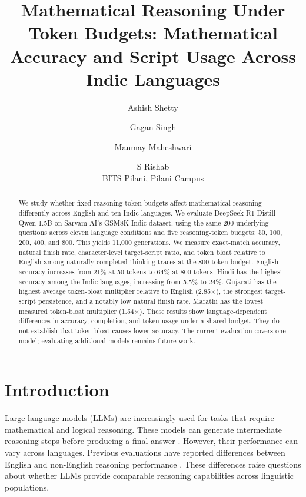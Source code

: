 \documentclass[11pt]{article}
\title{Mathematical Reasoning Under Token Budgets: Mathematical Accuracy and Script Usage Across Indic Languages}
\author{Ashish Shetty \and Gagan Singh \and Manmay Maheshwari  \and S Rishab \\
        BITS Pilani, Pilani Campus}
\begin{document}
\maketitle

\begin{abstract}
We study whether fixed reasoning-token budgets affect mathematical reasoning differently across English and ten Indic languages. We evaluate DeepSeek-R1-Distill-Qwen-1.5B on Sarvam AI's GSM8K-Indic dataset, using the same 200 underlying questions across eleven language conditions and five reasoning-token budgets: 50, 100, 200, 400, and 800. This yields 11,000 generations. We measure exact-match accuracy, natural finish rate, character-level target-script ratio, and token bloat relative to English among naturally completed thinking traces at the 800-token budget. English accuracy increases from 21\% at 50 tokens to 64\% at 800 tokens. Hindi has the highest accuracy among the Indic languages, increasing from 5.5\% to 24\%. Gujarati has the highest average token-bloat multiplier relative to English (2.85$\times$), the strongest target-script persistence, and a notably low natural finish rate. Marathi has the lowest measured token-bloat multiplier (1.54$\times$). These results show language-dependent differences in accuracy, completion, and token usage under a shared budget. They do not establish that token bloat causes lower accuracy. The current evaluation covers one model; evaluating additional models remains future work.
\end{abstract}
\section{Introduction}
\label{sec:intro}

Large language models (LLMs) are increasingly used for tasks that require mathematical and logical reasoning. These models can generate intermediate reasoning steps before producing a final answer \citep{wei2022chain, openai2024o1}. However, their performance can vary across languages. Previous evaluations have reported differences between English and non-English reasoning performance \citep{shi2022language, goyal2026mindthecap}. These differences raise questions about whether LLMs provide comparable reasoning capabilities across linguistic populations.
\end{document}
